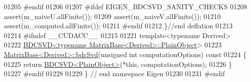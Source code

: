 \begin{DoxyCode}
01205 \textcolor{preprocessor}{#endif}
01206   
01207 \textcolor{preprocessor}{#ifdef EIGEN\_BDCSVD\_SANITY\_CHECKS}
01208   assert(m\_naiveU.allFinite());
01209   assert(m\_naiveV.allFinite());
01210   assert(m\_computed.allFinite());
01211 \textcolor{preprocessor}{#endif}
01212 \}\textcolor{comment}{//end deflation}
01213 
01214 \textcolor{preprocessor}{#ifndef \_\_CUDACC\_\_}
01215 
01221 \textcolor{keyword}{template}<\textcolor{keyword}{typename} Derived>
01222 \hyperlink{group___s_v_d___module_class_eigen_1_1_b_d_c_s_v_d}{BDCSVD<typename MatrixBase<Derived>::PlainObject}>
01223 \hyperlink{group___core___module_ae171b74b5d530846ee0836135ffcf837}{MatrixBase<Derived>::bdcSvd}(\textcolor{keywordtype}{unsigned} \textcolor{keywordtype}{int} computationOptions)\textcolor{keyword}{ const}
01224 \textcolor{keyword}{}\{
01225   \textcolor{keywordflow}{return} \hyperlink{group___s_v_d___module_class_eigen_1_1_b_d_c_s_v_d}{BDCSVD<PlainObject>}(*\textcolor{keyword}{this}, computationOptions);
01226 \}
01227 \textcolor{preprocessor}{#endif}
01228 
01229 \} \textcolor{comment}{// end namespace Eigen}
01230 
01231 \textcolor{preprocessor}{#endif}
\end{DoxyCode}
